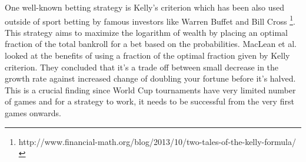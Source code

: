One well-known betting strategy is Kelly's criterion which has been also used outside of sport betting by famous investors like Warren Buffet and Bill Cross \footnote{http://www.financial-math.org/blog/2013/10/two-tales-of-the-kelly-formula/}. This strategy aims to maximize the logarithm of wealth by placing an optimal fraction of the total bankroll for a bet based on the probabilities. MacLean et al. \cite{maclean1992growth} looked at the benefits of using a fraction of the optimal fraction given by Kelly criterion. They concluded that it's a trade off between small decrease in the growth rate against increased change of doubling your fortune before it's halved. This is a crucial finding since World Cup tournaments have very limited number of games and for a strategy to work, it needs to be successful from the very first games onwards.






